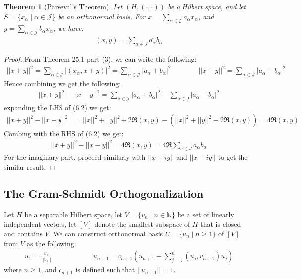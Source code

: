 \documentclass[11pt]{book}
\theoremstyle{break}
\theoremstyle{break}
\newtheorem{thm}{Theorem}[section]
\newcommand{\N}{\mathbb{N}}
\begin{document}
\begin{thm}[Parseval's Theorem]
Let $(H, (\cdot, \cdot))$ be a Hilbert space, and let $S = \{ x_\alpha \mid \alpha \in \mathcal{J}\}$ be an orthonormal basis. For $x =\sum_{\alpha \in \mathcal{J}} a_\alpha x_\alpha$, and $y = \sum_{\alpha \in \mathcal{J}} b_\alpha x_\alpha$, we have:
\begin{align*}
(x,y)=\sum_{\alpha \in J}\overline{a_\alpha}b_\alpha
\end{align*}
\end{thm}
\begin{proof}
From Theorem 25.1 part (3), we can write the following:
\begin{align*}
||x+y||^2 = \sum_{\alpha \in \mathcal{J}}|(x_\alpha , x+y)|^2 = \sum_{\alpha \in \mathcal{J}}|a_\alpha+b_\alpha|^2 \qquad\qquad ||x-y||^2 = \sum_{\alpha \in \mathcal{J}}|a_\alpha - b_\alpha|^2
\end{align*}
Hence combining we get the following:
\begin{align}
||x+y||^2 - ||x-y||^2 = \sum_{\alpha \in \mathcal{J}} |a_\alpha +b_\alpha|^2 - \sum_{\alpha \in J}|a_\alpha -b_\alpha|^2
\end{align}
expanding the LHS of (6.2) we get:
\begin{align*}
||x+y||^2 - ||x-y||^2  &= ||x||^2 + ||y||^2 + 2\Re(x,y) - \left( ||x||^2 + ||y||^2 - 2\Re(x,y)\right) = 4\Re(x,y) 
\end{align*}
Combing with the RHS of (6.2) we get:
\begin{align*}
||x+y||^2 - ||x-y||^2 = 4\Re(x,y) = 4\Re\sum_{\alpha \in J}\overline{ a_\alpha}b_\alpha
\end{align*}
For the imaginary part, proceed similarly with $||x+iy||$ and $||x-iy||$ to get the similar result. 
\end{proof}

\subsection{The Gram-Schmidt Orthogonalization}
Let $H$ be a separable Hilbert space, let $V = \{v_n \mid n \in \N\}$ be a set of linearly independent vectors, let $[V]$ denote the smallest subspace of $H$ that is closed and contains $V$. We can construct orthonormal basis $U = \{ u_n \mid n \geq 1\}$ of $[V]$ from $V$ as the following:
\begin{align*}
u_1 = \frac{v_1}{||v_1||} \qquad\qquad\qquad u_{n+1} = c_{n+1} \left( u_{n+1}- \sum_{j=1}^n (u_j, v_{n+1})u_j \right)
\end{align*}
where $n \geq 1$, and $c_{n+1}$ is defined such that $||u_{n+1}||=1$. \\
\end{document}
